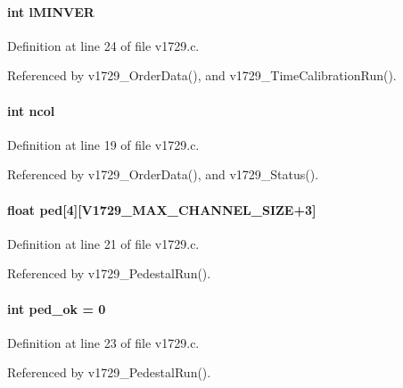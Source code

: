 \paragraph[{lMINVER}]{\setlength{\rightskip}{0pt plus 5cm}int {\bf lMINVER}}\hfill\label{v1729_8c_afd858f1cb933f5d117f591f6e40c3f7d}


Definition at line 24 of file v1729.c.

Referenced by v1729\_\-OrderData(), and v1729\_\-TimeCalibrationRun().
\paragraph[{ncol}]{\setlength{\rightskip}{0pt plus 5cm}int {\bf ncol}}\hfill\label{v1729_8c_a87e8ca5d4bb7a89c76b4393fa61d96c6}


Definition at line 19 of file v1729.c.

Referenced by v1729\_\-OrderData(), and v1729\_\-Status().
\paragraph[{ped}]{\setlength{\rightskip}{0pt plus 5cm}float {\bf ped}\mbox{[}4\mbox{]}\mbox{[}V1729\_\-MAX\_\-CHANNEL\_\-SIZE+3\mbox{]}}\hfill\label{v1729_8c_a0413a567e6d5e6f66f2842d3578e6b88}


Definition at line 21 of file v1729.c.

Referenced by v1729\_\-PedestalRun().
\paragraph[{ped\_\-ok}]{\setlength{\rightskip}{0pt plus 5cm}int {\bf ped\_\-ok} = 0}\hfill\label{v1729_8c_a013736fff742cafc37397bbf87fc62c5}


Definition at line 23 of file v1729.c.

Referenced by v1729\_\-PedestalRun().
